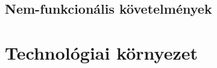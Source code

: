 \documentclass[a4paper,12pt]{article}
\begin{document}
\subsection{Nem-funkcionális követelmények}

\section{Technológiai környezet}

\end{document}
